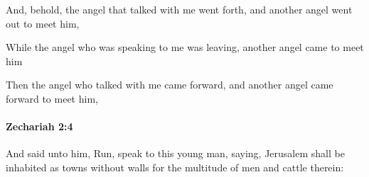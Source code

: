 			\begin{versebox}
					\item[BHS] 
					\item[LXX] 
					\item[ASV] And, behold, the angel that talked with me went forth, and another angel went out to meet him,
					\item[NIV] While the angel who was speaking to me was leaving, another angel came to meet him
					\item[NRSV] Then the angel who talked with me came forward, and another angel came forward to meet him,
			\end{versebox}

		\paragraph{Zechariah 2:4} %
			\label{ZECHARIAH-2-4}

			And said unto him, Run, speak to this young man, saying, Jerusalem shall be inhabited as towns without walls for the multitude of men and cattle therein:

